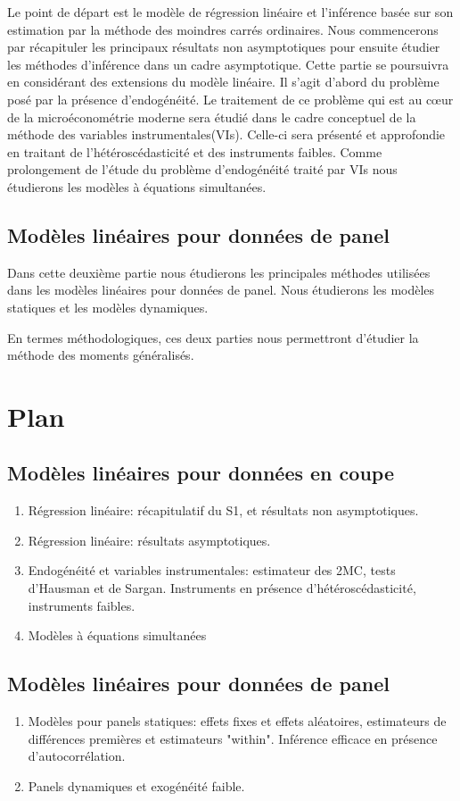  Le point de départ est le modèle de régression linéaire et l'inférence basée sur son estimation 
 par la méthode des moindres carrés ordinaires. Nous commencerons par récapituler 
 les principaux résultats non asymptotiques pour ensuite étudier 
 les méthodes d'inférence dans un cadre asymptotique. Cette partie se poursuivra en considérant des extensions 
du modèle linéaire. Il s'agit d'abord du problème posé par la présence d'endogénéité. 
Le traitement de ce problème qui est au cœur de la microéconométrie moderne sera étudié 
dans le cadre conceptuel de la méthode des variables instrumentales(VIs). 
Celle-ci sera présenté et approfondie en traitant de l'hétéroscédasticité  et des instruments faibles. 
Comme prolongement de l'étude du problème d'endogénéité traité par VIs nous étudierons les modèles à équations simultanées.


\subsection{Modèles linéaires pour données de panel}

Dans cette deuxième partie nous étudierons les principales méthodes utilisées dans les modèles linéaires 
pour données de panel. Nous étudierons les modèles statiques et les modèles dynamiques.

En termes méthodologiques, ces deux parties nous permettront d'étudier la méthode des moments généralisés.


\section{Plan}
 
\subsection{Modèles linéaires pour données en coupe}
\begin{enumerate}
 \item Régression linéaire:  récapitulatif du S1, et résultats non asymptotiques.
 \item Régression linéaire: résultats asymptotiques.
 \item Endogénéité et variables instrumentales: estimateur des 2MC, tests d'Hausman et de Sargan.
Instruments en présence d'hétéroscédasticité, instruments faibles.
\item Modèles à équations simultanées
\end{enumerate}
\subsection{Modèles linéaires pour données de panel}
\begin{enumerate}[resume]
\item Modèles pour panels statiques: effets fixes et effets aléatoires, estimateurs de différences premières 
et estimateurs "within". Inférence efficace en présence d'autocorrélation.
\item Panels dynamiques et exogénéité faible.
\end{enumerate}



